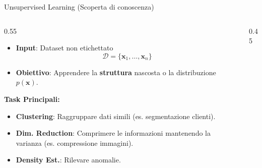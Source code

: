 \documentclass[aspectratio=169, 10pt]{beamer}
\begin{document}
\begin{frame}{Unsupervised Learning (Scoperta di conoscenza)}
    \begin{columns}[T]
        \begin{column}{0.55\textwidth}
            \vspace{0.5em}
            \begin{itemize}
                \item \textbf{Input}: Dataset non etichettato
                \[ \mathcal{D} = \{\mathbf{x}_1, \dots, \mathbf{x}_n\} \]
                \item \textbf{Obiettivo}: Apprendere la \textbf{struttura} nascosta o la distribuzione $p(\mathbf{x})$.
            \end{itemize}
            
            \vspace{1em}
            \textbf{Task Principali:}
            \begin{itemize}
                \item \textcolor{Secondary}{\textbf{Clustering}}: Raggruppare dati simili (es. segmentazione clienti).
                \item \textcolor{Accent}{\textbf{Dim. Reduction}}: Comprimere le informazioni mantenendo la varianza (es. compressione immagini).
                \item \textbf{Density Est.}: Rilevare anomalie.
            \end{itemize}
        \end{column}

        \begin{column}{0.45\textwidth}
            \centering
\end{column}
\end{columns}
\end{frame}
\end{document}
